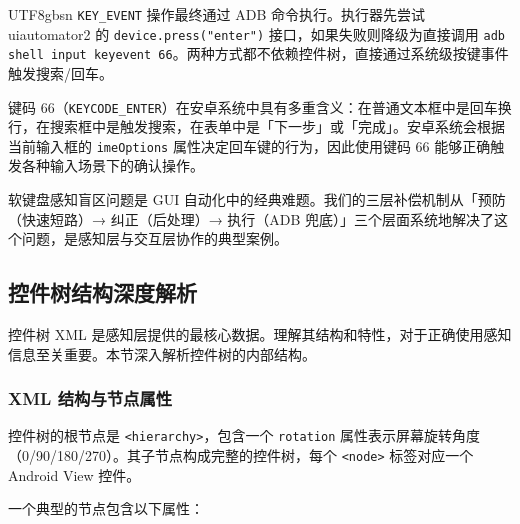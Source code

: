\documentclass{article}
\begin{document}
\begin{CJK}{UTF8}{gbsn}
\texttt{KEY\_EVENT} 操作最终通过 ADB 命令执行。执行器先尝试 uiautomator2 的 \texttt{device.press("enter")} 接口，如果失败则降级为直接调用 \texttt{adb shell input keyevent 66}。两种方式都不依赖控件树，直接通过系统级按键事件触发搜索/回车。

键码 66（\texttt{KEYCODE\_ENTER}）在安卓系统中具有多重含义：在普通文本框中是回车换行，在搜索框中是触发搜索，在表单中是「下一步」或「完成」。安卓系统会根据当前输入框的 \texttt{imeOptions} 属性决定回车键的行为，因此使用键码 66 能够正确触发各种输入场景下的确认操作。

软键盘感知盲区问题是 GUI 自动化中的经典难题。我们的三层补偿机制从「预防（快速短路）→ 纠正（后处理）→ 执行（ADB 兜底）」三个层面系统地解决了这个问题，是感知层与交互层协作的典型案例。

\subsection{控件树结构深度解析}

控件树 XML 是感知层提供的最核心数据。理解其结构和特性，对于正确使用感知信息至关重要。本节深入解析控件树的内部结构。

\subsubsection{XML 结构与节点属性}

控件树的根节点是 \texttt{<hierarchy>}，包含一个 \texttt{rotation} 属性表示屏幕旋转角度（0/90/180/270）。其子节点构成完整的控件树，每个 \texttt{<node>} 标签对应一个 Android View 控件。

一个典型的节点包含以下属性：


\end{CJK}
\end{document}
